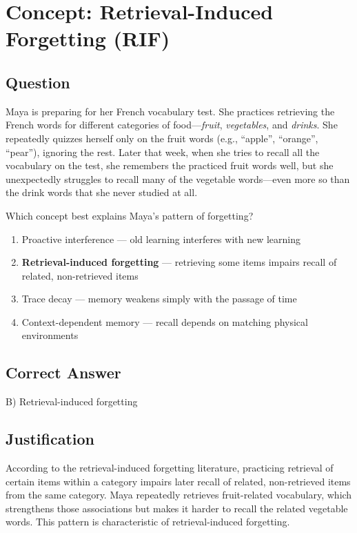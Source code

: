 \documentclass{article}
\begin{document}
\section*{Concept: Retrieval-Induced Forgetting (RIF)}

\subsection*{Question}

Maya is preparing for her French vocabulary test. She practices retrieving the French words for different categories of food---\emph{fruit}, \emph{vegetables}, and \emph{drinks}. She repeatedly quizzes herself only on the fruit words (e.g., ``apple'', ``orange'', ``pear''), ignoring the rest. Later that week, when she tries to recall all the vocabulary on the test, she remembers the practiced fruit words well, but she unexpectedly struggles to recall many of the vegetable words---even more so than the drink words that she never studied at all.

\vspace{1em}
\noindent
Which concept best explains Maya's pattern of forgetting?

\begin{enumerate}[label=\Alph*)]
    \item Proactive interference --- old learning interferes with new learning
    \item \textbf{Retrieval-induced forgetting} --- retrieving some items impairs recall of related, non-retrieved items
    \item Trace decay --- memory weakens simply with the passage of time
    \item Context-dependent memory --- recall depends on matching physical environments
\end{enumerate}

\subsection*{Correct Answer}

B) Retrieval-induced forgetting

\subsection*{Justification}

According to the retrieval-induced forgetting literature, practicing retrieval of certain items within a category impairs later recall of related, non-retrieved items from the same category. Maya repeatedly retrieves fruit-related vocabulary, which strengthens those associations but makes it harder to recall the related vegetable words. This pattern is characteristic of retrieval-induced forgetting.
\end{document}
